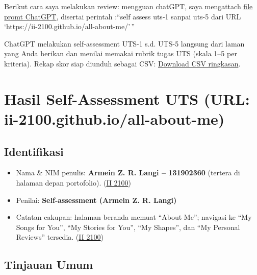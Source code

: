\documentclass[
  letterpaper,
  DIV=11,
  numbers=noendperiod]{scrreprt}
\providecommand{\tightlist}{%
  \setlength{\itemsep}{0pt}\setlength{\parskip}{0pt}}
\begin{document}
Berikut cara saya melakukan review: mengguan chatGPT, saya mengattach
\href{skor_uts.pdf}{file promt ChatGPT}, disertai perintah :``self
assess uts-1 sanpai uts-5 dari URL
`https://ii-2100.github.io/all-about-me/'\,''

ChatGPT melakukan self-assessment UTS-1 s.d. UTS-5 langsung dari laman
yang Anda berikan dan menilai memakai rubrik tugas UTS (skala 1--5 per
kriteria). Rekap skor siap diunduh sebagai CSV:
\href{sandbox:/mnt/data/UTS_self_assessment.csv}{Download CSV
ringkasan}.


\chapter{Hasil Self-Assessment UTS (URL:
ii-2100.github.io/all-about-me)}\label{hasil-self-assessment-uts-url-ii-2100.github.ioall-about-me}

\section{Identifikasi}\label{identifikasi}

\begin{itemize}
\tightlist
\item
  Nama \& NIM penulis: \textbf{Armein Z. R. Langi -- 131902360} (tertera
  di halaman depan portofolio).
  (\href{https://ii-2100.github.io/all-about-me/}{II 2100})
\item
  Penilai: \textbf{Self-assessment (Armein Z. R. Langi)}
\item
  Catatan cakupan: halaman beranda memuat ``About Me''; navigasi ke ``My
  Songs for You'', ``My Stories for You'', ``My Shapes'', dan ``My
  Personal Reviews'' tersedia.
  (\href{https://ii-2100.github.io/all-about-me/}{II 2100})
\end{itemize}

\section{Tinjauan Umum}\label{tinjauan-umum}
\end{document}
